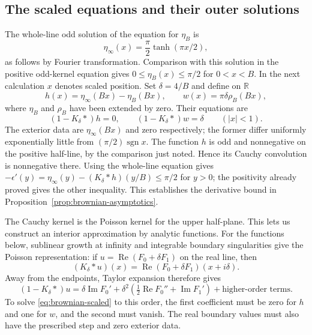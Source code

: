 \subsection{The scaled equations and their outer solutions}

The whole-line odd solution of the equation for $\eta_B$ is
\[
 \eta_\infty(x)=\frac\pi2\tanh(\pi x/2),
\]
as follows by Fourier transformation.  Comparison with this solution in the
positive odd-kernel equation gives $0\le\eta_B(x)\le\pi/2$ for $0<x<B$.
In the next calculation $x$
denotes scaled position.  Set $\delta=4/B$ and define on $\mathbb R$
\[
 h(x)=\eta_\infty(Bx)-\eta_B(Bx),
 \qquad w(x)=\pi\delta\rho_B(Bx),
\]
where $\eta_B$ and $\rho_B$ have been extended by zero.  Their equations are
\begin{equation}
 (1-K_\delta*)h=0,\qquad
 (1-K_\delta*)w=\delta\qquad (|x|<1).
 \label{eq:brownian-scaled}
\end{equation}
The exterior data are $\eta_\infty(Bx)$ and zero respectively; the former
differ uniformly exponentially little from $(\pi/2)\operatorname{sgn}x$.
The function $h$ is odd and nonnegative on the positive half-line, by the
comparison just noted.  Hence its Cauchy convolution is nonnegative there.
Using the whole-line equation gives
$-\epsilon'(y)=\eta_\infty(y)-(K_\delta*h)(y/B)\le\pi/2$ for $y>0$;
the positivity already proved gives the other inequality.  This establishes
the derivative bound in Proposition~\ref{prop:brownian-asymptotics}.

The Cauchy kernel is the Poisson kernel for the upper half-plane.  This
lets us construct an interior approximation by analytic functions.  For
the functions below, sublinear growth at infinity and
integrable boundary singularities give the Poisson representation: if
$u=\operatorname{Re}(F_0+\delta F_1)$ on the real line, then
\[
 (K_\delta*u)(x)=\operatorname{Re}(F_0+\delta F_1)(x+i\delta).
\]
Away from the endpoints, Taylor expansion therefore gives
\[
 (1-K_\delta*)u
 =\delta\operatorname{Im}F_0'
  +\delta^2\left(\tfrac12\operatorname{Re}F_0''
                         +\operatorname{Im}F_1'\right)
  +\text{higher-order terms}.
\]
To solve \eqref{eq:brownian-scaled} to this order, the first coefficient
must be zero for $h$ and one for $w$, and the second must vanish.
The real boundary values must also have the prescribed step and zero
exterior data.

